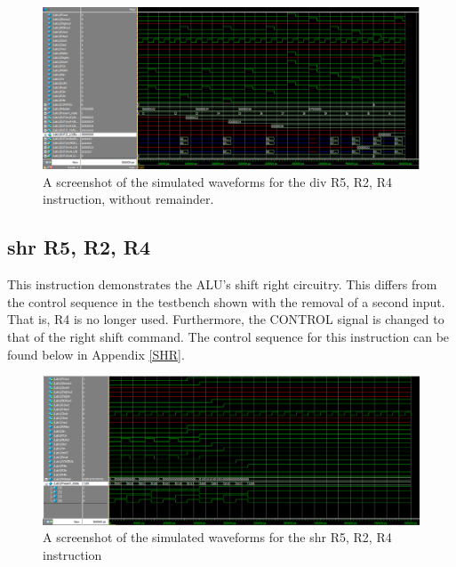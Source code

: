 \documentclass{article}
\begin{document}
    \begin{figure}[h!]
        \begin{center}
            \includegraphics[width=13cm]{DIV_final_image.png}
            \caption{A screenshot of the simulated waveforms for the div R5, R2, R4 instruction, without remainder.}
        \end{center}
    \end{figure}


    \subsection{shr R5, R2, R4}
    This instruction demonstrates the ALU's shift right circuitry. This differs from the control sequence in the testbench shown with the removal of a second input. That is, R4 is no longer used. Furthermore, the CONTROL signal is changed to that of the right shift command. The control sequence for this instruction can be found below in Appendix \ref{SHR}.
    
    \begin{figure}[h!]
        \begin{center}
            \includegraphics[width=13cm]{shr}
            \caption{A screenshot of the simulated waveforms for the shr R5, R2, R4 instruction}
        \end{center}
    \end{figure}
\end{document}
